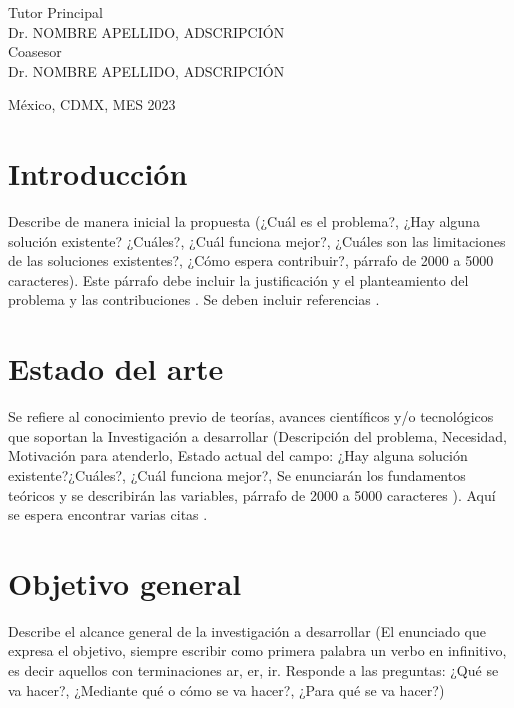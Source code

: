 \documentclass[letterpaper,12pt,oneside]{article}
\begin{document}
\begin{titlepage}
\begin{center}
\begin{center}
				\bigskip
				
				Tutor Principal\\
				Dr. NOMBRE APELLIDO, ADSCRIPCIÓN\\
				Coasesor \\
                Dr. NOMBRE APELLIDO, ADSCRIPCIÓN\\
			\end{center}
			
			\vfill
			
			\begin{center}
				{México, CDMX, MES 2023}\\
			\end{center}
			\cleardoublepage
		\end{center}
	\end{titlepage}
 
\clearpage
    

\section{Introducción} 

Describe de manera inicial la propuesta (¿Cuál es el problema?, ¿Hay alguna solución existente? ¿Cuáles?, ¿Cuál funciona mejor?, ¿Cuáles son las limitaciones de las soluciones existentes?, ¿Cómo espera contribuir?, párrafo de 2000 a 5000 caracteres). Este párrafo debe incluir la justificación y el planteamiento del problema y las contribuciones \cite{phil99}. Se deben incluir referencias \cite{smit54, jame76}.

\section{Estado del arte}
Se refiere al conocimiento previo de teorías, avances científicos y/o tecnológicos que soportan la Investigación a desarrollar (Descripción del problema, Necesidad, Motivación para atenderlo, Estado actual del campo: ¿Hay alguna solución existente?¿Cuáles?, ¿Cuál funciona mejor?, Se enunciarán los fundamentos teóricos y se describirán las variables, párrafo de 2000 a 5000 caracteres \cite{gree00}). Aquí se espera encontrar varias citas \cite{colu92}. 

\section{Objetivo general}
Describe el alcance general de la investigación a desarrollar (El enunciado que expresa el objetivo, siempre escribir como primera palabra un verbo en infinitivo, es decir aquellos con terminaciones ar, er, ir. Responde a las preguntas: ¿Qué se va hacer?, ¿Mediante qué o cómo se va hacer?, ¿Para qué se va hacer?)
\end{document}
